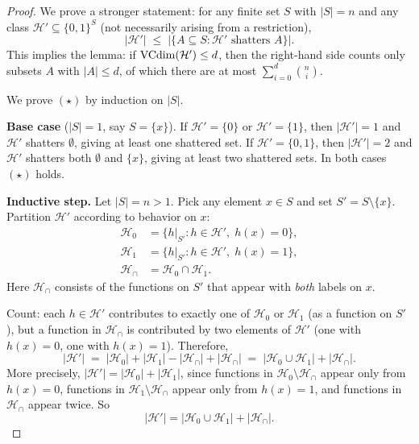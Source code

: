 \begin{proof}
\label{lem:sauer-shelah-proof}
We prove a stronger statement: for any finite set $S$ with $|S| = n$ and
any class $\mathcal{H}' \subseteq \{0,1\}^S$ (not necessarily arising from
a restriction),
\[
  |\mathcal{H}'| \;\leq\; \bigl|\{A \subseteq S : \mathcal{H}' \text{ shatters } A\}\bigr|.
  \tag{$\star$}
\]
This implies the lemma: if $\mathrm{VCdim}(\mathcal{H}') \leq d$, then the right-hand
side counts only subsets $A$ with $|A| \leq d$, of which there are at most
$\sum_{i=0}^{d}\binom{n}{i}$.

We prove $(\star)$ by induction on $|S|$.

\smallskip\noindent
\textbf{Base case} ($|S| = 1$, say $S = \{x\}$).  If
$\mathcal{H}' = \{0\}$ or $\mathcal{H}' = \{1\}$, then $|\mathcal{H}'| = 1$
and $\mathcal{H}'$ shatters $\emptyset$, giving at least one shattered set.
If $\mathcal{H}' = \{0,1\}$, then $|\mathcal{H}'| = 2$ and $\mathcal{H}'$
shatters both $\emptyset$ and $\{x\}$, giving at least two shattered sets.
In both cases $(\star)$ holds.

\smallskip\noindent
\textbf{Inductive step.}  Let $|S| = n > 1$.  Pick any element $x \in S$
and set $S' = S \setminus \{x\}$.  Partition $\mathcal{H}'$ according to
behavior on $x$:
\begin{align*}
  \mathcal{H}_0 &= \{h|_{S'} : h \in \mathcal{H}',\; h(x) = 0\}, \\
  \mathcal{H}_1 &= \{h|_{S'} : h \in \mathcal{H}',\; h(x) = 1\}, \\
  \mathcal{H}_\cap &= \mathcal{H}_0 \cap \mathcal{H}_1.
\end{align*}
Here $\mathcal{H}_\cap$ consists of the functions on $S'$ that appear with
\emph{both} labels on $x$.

Count: each $h \in \mathcal{H}'$ contributes to exactly one of $\mathcal{H}_0$
or $\mathcal{H}_1$ (as a function on $S'$), but a function in
$\mathcal{H}_\cap$ is contributed by two elements of $\mathcal{H}'$ (one
with $h(x)=0$, one with $h(x)=1$).  Therefore,
\[
  |\mathcal{H}'| \;=\; |\mathcal{H}_0| + |\mathcal{H}_1| - |\mathcal{H}_\cap|
  + |\mathcal{H}_\cap|
  \;=\; |\mathcal{H}_0 \cup \mathcal{H}_1| + |\mathcal{H}_\cap|.
\]
More precisely, $|\mathcal{H}'| = |\mathcal{H}_0| + |\mathcal{H}_1|$, since
functions in $\mathcal{H}_0 \setminus \mathcal{H}_\cap$ appear only from
$h(x) = 0$, functions in $\mathcal{H}_1 \setminus \mathcal{H}_\cap$ appear
only from $h(x) = 1$, and functions in $\mathcal{H}_\cap$ appear twice.  So
\[
  |\mathcal{H}'| = |\mathcal{H}_0 \cup \mathcal{H}_1| + |\mathcal{H}_\cap|.
\]


\end{proof}
